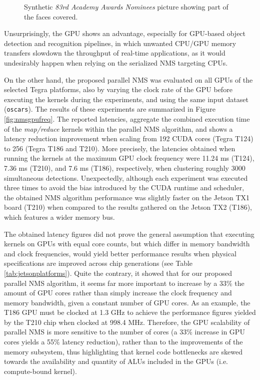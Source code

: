 \begin{figure}[h]
  \centering
  \setlength{\fboxsep}{0pt}
  \caption{\label{fig:nmsoscars} Synthetic \emph{83rd Academy Awards Nominees} picture showing part of the faces covered.}
\end{figure} 

Unsurprisingly, the GPU shows an advantage, especially for GPU-based object detection and 
recognition pipelines, in which unwanted CPU/GPU memory transfers slowdown the throughput of real-time applications, as it 
would undesirably happen when relying on the serialized NMS targeting CPUs.

On the other hand, the proposed parallel NMS was evaluated on all GPUs of the selected Tegra platforms, also by varying the clock rate of the GPU before executing  
the kernels during the experiments, and using the same input dataset (\texttt{oscars}). The results of these experiments are 
summarized in Figure \ref{fig:nmsgpufreq}. The reported latencies, aggregate the combined execution time of the \emph{map/reduce} 
kernels within the parallel NMS algorithm, and shows a latency reduction improvement when scaling from 192 CUDA cores (Tegra T124) 
to 256 (Tegra T186 and T210). More precisely, the latencies obtained when running the kernels at the maximum GPU clock 
frequency were 11.24 ms (T124), 7.36 ms (T210), and 7.6 ms (T186), respectively, when clustering roughly 3000 simultaneous 
detections. Unexpectedly, although each experiment was executed three times to avoid the bias introduced by the CUDA runtime 
and scheduler, the obtained NMS algorithm performance was slightly faster on the Jetson TX1 board (T210) when compared to 
the results gathered on the Jetson TX2 (T186), which features a wider memory bus.

The obtained latency figures did not prove the general assumption that executing kernels on GPUs with equal core counts, but 
which differ in memory bandwidth and clock frequencies, would yield better performance results when physical specifications 
are improved across chip generations (see Table \ref{tab:jetsonplatforms}). Quite the contrary, it showed that for our   
proposed parallel NMS algorithm, it seems far more important to increase by a 33\% the amount of GPU cores rather than 
simply increase the clock frequency and memory bandwidth, given a constant number of GPU cores. As an example, the T186 GPU 
must be clocked at 1.3 GHz to achieve the performance figures yielded by the T210 chip when clocked at 998.4 MHz. Therefore, 
the GPU scalability of parallel NMS is more sensitive to the number of cores (a 33\% increase in GPU cores 
yields a 55\% latency reduction), rather than to the improvements of the memory subsystem, thus highlighting that kernel code 
bottlenecks are skewed towards the availability and quantity of ALUs included in the GPUs (i.e. compute-bound kernel).


